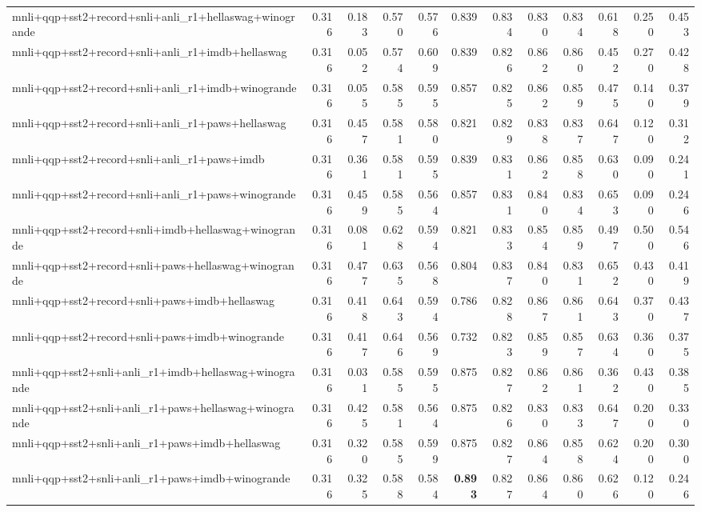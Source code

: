 \begin{table}[t]
\begin{tabular}{lrrrrrrrrrrr}
    mnli+qqp+sst2+record+snli+anli\_r1+hellaswag+winogrande & 0.316 & 0.183 & 0.570 & 0.576 & 0.839 & 0.834 & 0.830 & 0.834 & 0.618 & 0.250 & 0.453 \\
    mnli+qqp+sst2+record+snli+anli\_r1+imdb+hellaswag & 0.316 & 0.052 & 0.574 & 0.609 & 0.839 & 0.826 & 0.862 & 0.860 & 0.452 & 0.270 & 0.428 \\
    mnli+qqp+sst2+record+snli+anli\_r1+imdb+winogrande & 0.316 & 0.055 & 0.585 & 0.595 & 0.857 & 0.825 & 0.862 & 0.859 & 0.475 & 0.140 & 0.379 \\
    mnli+qqp+sst2+record+snli+anli\_r1+paws+hellaswag & 0.316 & 0.457 & 0.581 & 0.580 & 0.821 & 0.829 & 0.838 & 0.837 & 0.647 & 0.120 & 0.312 \\
    mnli+qqp+sst2+record+snli+anli\_r1+paws+imdb & 0.316 & 0.361 & 0.581 & 0.595 & 0.839 & 0.831 & 0.862 & 0.858 & 0.630 & 0.090 & 0.241 \\
    mnli+qqp+sst2+record+snli+anli\_r1+paws+winogrande & 0.316 & 0.459 & 0.585 & 0.564 & 0.857 & 0.831 & 0.840 & 0.834 & 0.653 & 0.090 & 0.246 \\
    mnli+qqp+sst2+record+snli+imdb+hellaswag+winogrande & 0.316 & 0.081 & 0.628 & 0.594 & 0.821 & 0.833 & 0.854 & 0.859 & 0.497 & 0.500 & 0.546 \\
    mnli+qqp+sst2+record+snli+paws+hellaswag+winogrande & 0.316 & 0.477 & 0.635 & 0.568 & 0.804 & 0.837 & 0.840 & 0.831 & 0.652 & 0.430 & 0.419 \\
    mnli+qqp+sst2+record+snli+paws+imdb+hellaswag & 0.316 & 0.418 & 0.643 & 0.594 & 0.786 & 0.828 & 0.867 & 0.861 & 0.643 & 0.370 & 0.437 \\
    mnli+qqp+sst2+record+snli+paws+imdb+winogrande & 0.316 & 0.417 & 0.646 & 0.569 & 0.732 & 0.823 & 0.859 & 0.857 & 0.634 & 0.360 & 0.375 \\
    mnli+qqp+sst2+snli+anli\_r1+imdb+hellaswag+winogrande & 0.316 & 0.031 & 0.585 & 0.595 & 0.875 & 0.827 & 0.862 & 0.861 & 0.362 & 0.430 & 0.385 \\
    mnli+qqp+sst2+snli+anli\_r1+paws+hellaswag+winogrande & 0.316 & 0.425 & 0.581 & 0.564 & 0.875 & 0.826 & 0.830 & 0.833 & 0.647 & 0.200 & 0.330 \\
    mnli+qqp+sst2+snli+anli\_r1+paws+imdb+hellaswag & 0.316 & 0.320 & 0.585 & 0.599 & 0.875 & 0.827 & 0.864 & 0.858 & 0.624 & 0.200 & 0.300 \\
    mnli+qqp+sst2+snli+anli\_r1+paws+imdb+winogrande & 0.316 & 0.325 & 0.588 & 0.584 & \textbf{0.893} & 0.827 & 0.864 & 0.860 & 0.626 & 0.120 & 0.246 \\

\end{tabular}
\end{table}
